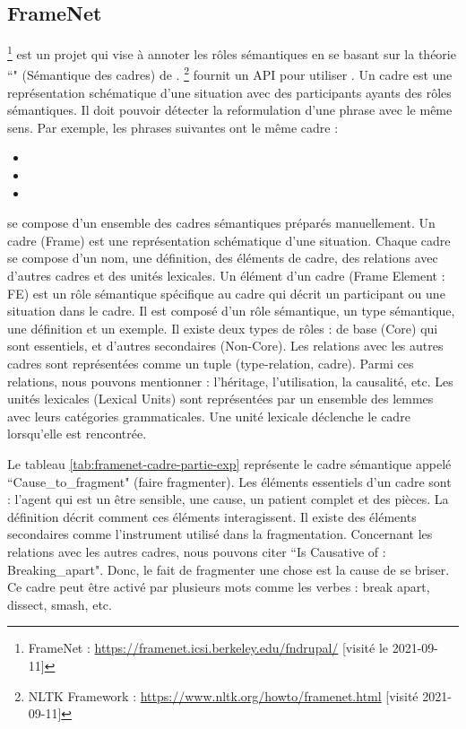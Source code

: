 \documentclass{KodeBook}
\begin{document}
\subsection{FrameNet}

\footnote{FrameNet : \url{https://framenet.icsi.berkeley.edu/fndrupal/} [visité le 2021-09-11]} est un projet qui vise à annoter les rôles sémantiques en se basant sur la théorie ``" (Sémantique des cadres) de . 
\footnote{NLTK Framework : \url{https://www.nltk.org/howto/framenet.html} [visité 2021-09-11]} fournit un API pour utiliser . 
Un cadre est une représentation schématique d'une situation avec des participants ayants des rôles sémantiques.
Il doit pouvoir détecter la reformulation d'une phrase avec le même sens. 
Par exemple, les phrases suivantes ont le même cadre :
\begin{itemize}
	\item {}
	\item {}
	\item {}
\end{itemize}


 se compose d'un ensemble des cadres sémantiques préparés manuellement. 
Un cadre (Frame) est une représentation schématique d'une situation.
Chaque cadre se compose d'un nom, une définition, des éléments de cadre, des  relations avec d'autres cadres et des unités lexicales. 
Un élément d'un cadre (Frame Element : FE) est un rôle sémantique spécifique au cadre qui décrit un participant ou une situation dans le cadre. 
Il est composé d'un rôle sémantique, un type sémantique, une définition et un exemple. 
Il existe deux types de rôles : de base (Core) qui sont essentiels, et d'autres secondaires (Non-Core).
Les relations avec les autres cadres sont représentées comme un tuple (type-relation, cadre). 
Parmi ces relations, nous pouvons mentionner : l'héritage, l'utilisation, la causalité, etc. 
Les unités lexicales (Lexical Units) sont représentées par un ensemble des lemmes avec leurs catégories grammaticales.
Une unité lexicale déclenche le cadre lorsqu'elle est rencontrée.

Le tableau \ref{tab:framenet-cadre-partie-exp} représente le cadre sémantique appelé ``Cause\_to\_fragment" (faire fragmenter). 
Les éléments essentiels d'un cadre sont : l'agent qui est un être sensible, une cause, un patient complet et des pièces. 
La définition décrit comment ces éléments interagissent.
Il existe des éléments secondaires comme l'instrument utilisé dans la fragmentation. 
Concernant les relations avec les autres cadres, nous pouvons citer ``Is Causative of : Breaking\_apart". 
Donc, le fait de fragmenter une chose est la cause de se briser. 
Ce cadre peut être activé par plusieurs mots comme les verbes : break apart, dissect, smash, etc.
\end{document}
